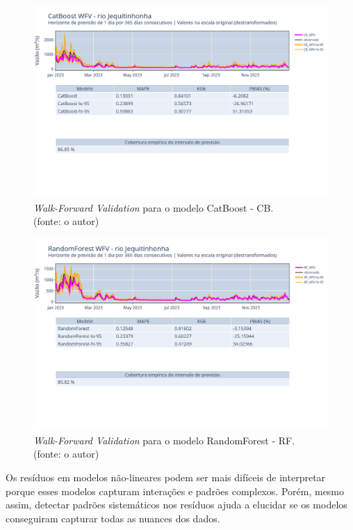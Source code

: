 \begin{figure}[!h]
\centering
\includegraphics[scale=0.33]{Figuras/jequiti/wfv/CB/CB_WFV_LOG.png}
\caption{\textit{Walk-Forward Validation} para o modelo CatBoost - CB.\\(fonte: o autor)}
\label{fig:jequiti_CB_WFV_LOG}
\end{figure}

\begin{figure}[!h]
\centering
\includegraphics[scale=0.33]{Figuras/jequiti/wfv/RF/RF_WFV_LOG.png}
\caption{\textit{Walk-Forward Validation} para o modelo RandomForest - RF.\\(fonte: o autor)}
\label{fig:jequiti_RF_WFV_LOG}
\end{figure}
\clearpage

Os resíduos em modelos não-lineares podem ser mais difíceis de interpretar porque esses modelos capturam interações e padrões complexos. Porém, mesmo assim, detectar padrões sistemáticos nos resíduos ajuda a elucidar se os modelos conseguiram capturar todas as nuances dos dados.

